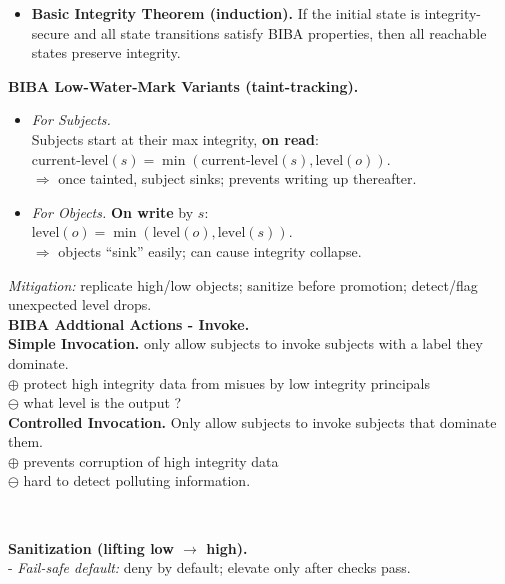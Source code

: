 \documentclass[main.tex]{subfiles}
\begin{document}
\begin{minipage}[t]{0.495\textwidth}
\begin{minipage}[t]{0.5\textwidth}
\begin{itemize}[itemsep=2pt]
			\item[]	\textbf{Basic Integrity Theorem (induction).} If the initial state is integrity-secure and all state transitions satisfy BIBA properties, then all reachable states preserve integrity.
		\end{itemize}
	\end{minipage}
	\begin{minipage}[t]{0.5\textwidth}
		\textbf{BIBA Low-Water-Mark Variants (taint-tracking).}
		\begin{itemize}[itemsep=1pt, leftmargin=10pt]
			\item[1.] \textit{For Subjects.}\\ Subjects start at their max integrity, \textbf{on read}:\\ $\text{current-level}(s) = \min(\text{current-level}(s), \text{level}(o))$.	\\$\Rightarrow$ once tainted, subject sinks; prevents writing up thereafter.
			\item[2.] \textit{For Objects.} \textbf{On write} by $s$:\\$\text{level}(o) = \min(\text{level}(o), \text{level}(s))$.\\
			      $\Rightarrow$ objects “sink” easily; can cause integrity collapse.
		\end{itemize}
		\textit{Mitigation:} replicate high/low objects; sanitize before promotion; detect/flag unexpected level drops.\\
		\textbf{BIBA Addtional Actions - Invoke.}\\
		\textbf{Simple Invocation.} only allow subjects to invoke subjects with a label they dominate.\\
		$\oplus$ protect high integrity data from misues by low integrity principals\\
		$\ominus$ what level is the output ?\\
		\textbf{Controlled Invocation.} Only allow subjects to invoke subjects that dominate them.\\
		$\oplus$ prevents corruption of high integrity data\\
		$\ominus$ hard to detect polluting information.
	\end{minipage}\\
	\begin{minipage}[t]{0.44\textwidth}
		\textbf{Sanitization (lifting low $\rightarrow$ high).}\\
		- \textit{Fail-safe default:} deny by default; elevate only after checks pass.
	\end{minipage}

\end{minipage}
\end{document}
